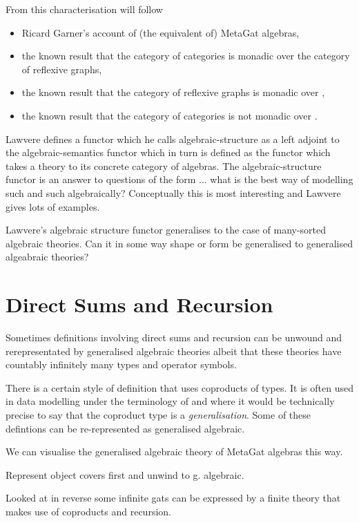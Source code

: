 \documentclass[10pt,a4paper]{article}
\theoremstyle{remark}
\begin{document}
From this characterisation will follow 
\begin{itemize}
\item Ricard Garner's account of (the equivalent of) MetaGat algebras,
\item  the known result that the category of categories is monadic over the category of reflexive graphs, 
\item the known result that the category of reflexive graphs is monadic over ,
\item the known result that the category of categories is not monadic over .
\end{itemize}

\note
Lawvere defines a functor which he calls algebraic-structure as a  left adjoint  to the algebraic-semantics functor which in turn is defined as the functor which takes a theory to its concrete category of algebras. 
The algebraic-structure functor is an answer to questions of the form ... what is the best way of modelling such and such algebraically? 
Conceptually this is most interesting and Lawvere gives lots of examples. 

Lawvere's algebraic structure functor generalises to the case of many-sorted algebraic theories.
Can it in some way shape or form be generalised to generalised algeabraic theories?


\section{Direct Sums and Recursion}

\note Sometimes definitions involving direct sums and recursion can be unwound and rerepresentated by
generalised algebraic theories albeit that these theories have countably infinitely many types and operator symbols.
 
There is a certain style of definition that uses coproducts of types. It is often used in data modelling 
under the terminology of  and where it would be technically precise to say that the
coproduct type is a \textit{generalisation}. Some of these defintions can be re-represented as generalised algebraic.

We can visualise the generalised algebraic theory of MetaGat algebras this way.

Represent object covers first and unwind to g. algebraic. \tbd

Looked at in reverse some infinite gats can be expressed by a finite theory that makes use of coproducts and recursion.
  
\end{document}
